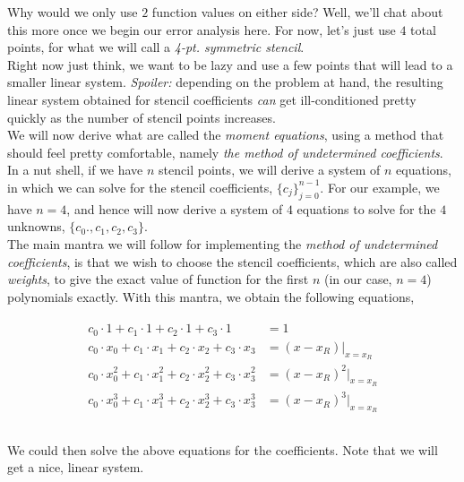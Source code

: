\documentclass[paper=a4, fontsize=11pt]{scrartcl} %
\numberwithin{equation}{section} %
\numberwithin{figure}{section} %
\numberwithin{table}{section} %
\begin{document}
Why would we only use $2$ function values on either side? Well, we'll chat about this more once we begin our error analysis here. For now, let's just use $4$ total points, for what we will call a \emph{4-pt. symmetric stencil}.\\

Right now just think, we want to be lazy and use a few points that will lead to a smaller linear system. \emph{Spoiler:} depending on the problem at hand, the resulting linear system obtained for stencil coefficients \emph{can} get ill-conditioned pretty quickly as the number of stencil points increases.\\

We will now derive what are called the \emph{moment equations}, using a method that should feel pretty comfortable, namely \emph{the method of undetermined coefficients}. In a nut shell, if we have $n$ stencil points, we will derive a system of $n$ equations, in which we can solve for the stencil coefficients, $\{c_{j}\}_{j=0}^{n-1}$. For our example, we have $n=4$, and hence will now derive a system of $4$ equations to solve for the $4$ unknowns, $\{c_0.,c_1,c_2,c_3\}$. \\

The main mantra we will follow for implementing the \emph{method of undetermined coefficients}, is that we wish to choose the stencil coefficients, which are also called \emph{weights}, to give the exact value of function for the first $n$ (in our case, $n=4$) polynomials exactly. With this mantra, we obtain the following equations, 

\begin{align}
\nonumber
\begin{split}
c_0\cdot 1 + c_1\cdot 1 + c_2\cdot 1 + c_3\cdot 1 &= 1 \\
c_0\cdot x_0 + c_1\cdot x_1 + c_2\cdot x_2 + c_3\cdot x_3 &= (x-x_R) \Big|_{x=x_R}  \\
c_0\cdot x_0^2 + c_1\cdot x_1^2 + c_2\cdot x_2^2 + c_3\cdot x_3^2 &= (x-x_R)^2 \Big|_{x=x_R}  \\
c_0\cdot x_0^3 + c_1\cdot x_1^3 + c_2\cdot x_2^3 + c_3\cdot x_3^3 &= (x-x_R)^3 \Big|_{x=x_R}  \\ \\
\end{split}
\end{align}

We could then solve the above equations for the coefficients. Note that we will get a nice, linear system.\\
\end{document}
